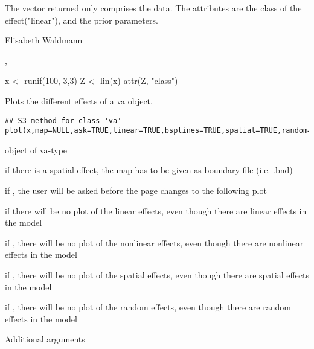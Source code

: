 \documentclass[a4paper]{book}
\begin{document}
%
\begin{Value}
The vector returned only comprises the data. The attributes are the class of the effect("linear"), and the prior parameters.  
\end{Value}
%
\begin{Author}\relax
Elisabeth Waldmann

\end{Author}
%
\begin{SeeAlso}\relax
{}, 

\end{SeeAlso}
%
\begin{Examples}
\begin{ExampleCode}
x <- runif(100,-3,3)
Z <- lin(x)
attr(Z, "class")
\end{ExampleCode}
\end{Examples}
%
\begin{Description}\relax

Plots the different effects of a va object.
\end{Description}
%
\begin{Usage}
\begin{verbatim}
## S3 method for class 'va'
plot(x,map=NULL,ask=TRUE,linear=TRUE,bsplines=TRUE,spatial=TRUE,random=TRUE,...)
\end{verbatim}
\end{Usage}
%
\begin{Arguments}
\begin{ldescription}
\item[\code{x}] 
object of va-type
\item[\code{map}] 
if there is a spatial effect, the map has to be given as boundary file (i.e. .bnd)
\item[\code{ask}] 
if , the user will be asked before the page changes to the following plot
\item[\code{linear}] if  there will be no plot of the linear effects, even though there are linear effects in the model
\item[\code{bsplines}] if , there will be no plot of the nonlinear effects, even though there are nonlinear effects in the model
\item[\code{spatial}] if , there will be no plot of the spatial effects, even though there are spatial effects in the model
\item[\code{random}] if , there will be no plot of the random effects, even though there are random effects in the model
\item[\code{...}] Additional arguments
\end{ldescription}
\end{Arguments}
\end{document}

